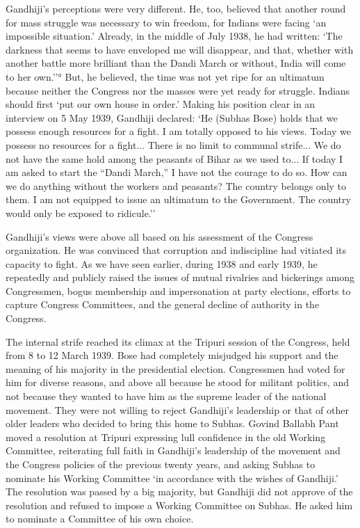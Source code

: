 Gandhiji's perceptions were very different. He, too, believed that another round for mass struggle was necessary to win freedom, for Indians were facing `an impossible situation.' Already, in the middle of July 1938, he had written: `The darkness that seems to have enveloped me will disappear, and that, whether with another battle more brilliant than the Dandi March or without, India will come to her own.''° But, he believed, the time was not yet ripe for an ultimatum because neither the Congress nor the masses were yet ready for struggle. Indians should first `put our own house in order.' Making his position clear in an interview on 5 May 1939, Gandhiji declared: `He (Subhas Bose) holds that we possess enough resources for a fight. I am totally opposed to his views. Today we possess no resources for a fight... There is no limit to communal strife... We do not have the same hold among the peasants of Bihar as we used to... If today I am asked to start the ``Dandi March,'' I have not the courage to do so. How can we do anything without the workers and peasants? The country belongs only to them. I am not equipped to issue an ultimatum to the Government. The country would only be exposed to ridicule.'' 

Gandhiji's views were above all based on his assessment of the Congress organization. He was convinced that corruption and indiscipline had vitiated its capacity to fight. As we have seen earlier, during 1938 and early 1939, he repeatedly and publicly raised the issues of mutual rivalries and bickerings among Congressmen, bogus membership and impersonation at party elections, efforts to capture Congress Committees, and the general decline of authority in the Congress. 

The internal strife reached its climax at the Tripuri session of the Congress, held from 8 to 12 March 1939. Bose had completely misjudged his support and the meaning of his majority in the presidential election. Congressmen had voted for him for diverse reasons, and above all because he stood for militant politics, and not because they wanted to have him as the supreme leader of the national movement. They were not willing to reject Gandhiji's leadership or that of other older leaders who decided to bring this home to Subhas. Govind Ballabh Pant moved a resolution at Tripuri expressing lull confidence in the old Working Committee, reiterating full faith in Gandhiji's leadership of the movement and the Congress policies of the previous twenty years, and asking Subhas to nominate his Working Committee `in accordance with the wishes of Gandhiji.' The resolution was passed by a big majority, but Gandhiji did not approve of the resolution and refused to impose a Working Committee on Subhas. He asked him to nominate a Committee of his own choice. 


